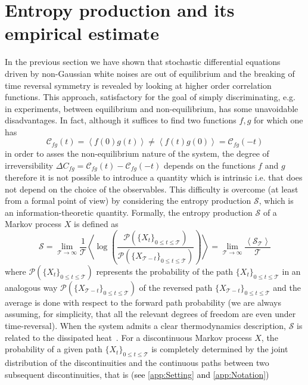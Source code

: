 \documentclass[12pt]{iopart}
\newcommand{\lx} {\left}
\newcommand{\rx} {\right}
\newcommand{\ave}[1] {\lx\langle #1 \rx\rangle}
\newcommand{\cP} {\mathcal{P}}
\newcommand{\cS} {\mathcal{S}}
\newcommand{\cC} {\mathcal{C}}
\newcommand{\cT} {\mathcal{T}}
\begin{document}
\section{Entropy production and its empirical estimate}
\label{sec:ep}
In the previous section we have shown that stochastic differential equations driven by non-Gaussian white noises are out of equilibrium and the breaking of time reversal symmetry is revealed by looking at higher order correlation functions. This approach, satisfactory for the goal of simply discriminating, e.g. in experiments, between equilibrium and non-equilibrium, has some unavoidable disadvantages. In fact, although it suffices to find two functions $f,g$ for which one has \begin{equation}
\cC_{fg}(t)=\ave{f(0)g(t)}\neq \ave{f(t)g(0)}=\cC_{fg}(-t)
\end{equation}
in order to asses the non-equilibrium nature of the system, the degree of irreversibility $\Delta C_{fg}=\cC_{fg}(t)-\cC_{fg}(-t)$ depends on the functions $f$ and $g$ therefore it is not possible to introduce a quantity which is intrinsic i.e. that does not depend on the choice of the observables. This difficulty is overcome (at least from a formal point of view) by considering the entropy production $\cS$, which is an information-theoretic quantity. Formally, the entropy production $\cS$ of a Markov process $X$ is defined as~\textcolor{black}{\cite{lebowitz1999gallavotti}}
\begin{equation}
    \cS=\lim_{\cT\to\infty}\frac{1}{\cT}\ave{\log\lx(\frac{\cP(\{X_t\}_{0\le t \le \cT})}{\cP(\{ X_{\cT - t}\}_{0 \le t \le \cT})}\rx)}=\lim_{\cT\to\infty} \frac{\ave{\cS_\cT}}{\cT}
    \label{eq:epr}
\end{equation}
where $\cP(\{X_t\}_{0\le t \le \cT})$ represents the probability of the path $\{X_t\}_{0\le t \le \cT}$ in an analogous way $\cP(\{ X_{\cT - t}\}_{0 \le t \le \cT})$ of the reversed path $\{ X_{\cT - t}\}_{0 \le t \le \cT}$ and the average is done with respect to the forward path probability (we are always assuming, for simplicity, that all the relevant degrees of freedom are even under time-reversal). When the system admits a clear thermodynamics description, $\cS$ is related to the dissipated heat~\textcolor{black}{\cite{Sekimoto2010,seifertrev}}. For a discontinuous Markov process $X$, the probability of a given path $\{X_t\}_{0\le t \le \cT}$ is completely determined by the joint distribution of the discontinuities and the continuous paths between two subsequent discontinuities, that is (\textcolor{black}{see \ref{app:Setting} and \ref{app:Notation}})
\end{document}
